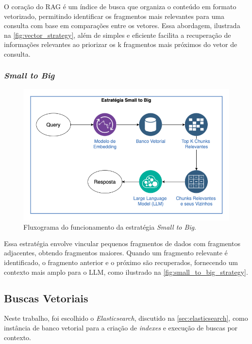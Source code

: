 \documentclass[a4paper, 12pt]{article}
\begin{document}
    O coração do RAG é um índice de busca que organiza o conteúdo em formato vetorizado, permitindo identificar os fragmentos mais relevantes para uma consulta com base em comparações entre os vetores. Essa abordagem, ilustrada na \autoref{fig:vector_strategy}, além de simples e eficiente facilita a recuperação de informações relevantes ao priorizar os k fragmentos mais próximos do vetor de consulta.

    \subsubsection{\textit{Small to Big}} \label{sec:small_to_big_search}

    \begin{figure}[ht]
        \includegraphics[width=\textwidth,height=0.9\textheight,keepaspectratio]{small-to-big-strategy.png}
        \centering
        \caption{Fluxograma do funcionamento da estratégia \textit{Small to Big}.}
        \centering
        \label{fig:small_to_big_strategy}
    \end{figure}

    Essa estratégia envolve vincular pequenos fragmentos de dados com fragmentos adjacentes, obtendo fragmentos maiores. Quando um fragmento relevante é identificado, o fragmento anterior e o próximo são recuperados, fornecendo um contexto mais amplo para o LLM, como ilustrado na \autoref{fig:small_to_big_strategy}.

    \subsection{Buscas Vetoriais} \label{sec:vec_search}

    Neste trabalho, foi escolhido o \textit{Elasticsearch}, discutido na \autoref{sec:elasticsearch}, como instância de banco vetorial para a criação de \textit{indexes} e execução de buscas por contexto.
\end{document}
